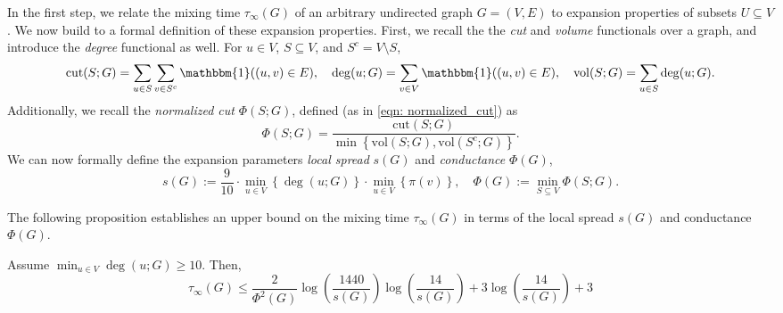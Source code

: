 \documentclass[11pt,twoside]{article}
\newcommand{\set}[1]{\left\{#1\right\}}
\newcommand{\vol}{\mathrm{vol}}
\newcommand{\cut}{\mathrm{cut}}
\newcommand{\1}{\mathbbm{1}}
\begin{document}
In the first step, we relate the mixing time $\tau_{\infty}(G)$ of an arbitrary undirected graph $G = (V,E)$ to expansion properties of subsets $U \subseteq V$. We now build to a formal definition of these expansion properties. First, we recall the the \emph{cut} and \emph{volume} functionals over a graph, and introduce the \emph{degree} functional as well. For $u \in V$, $S \subseteq V$, and $S^c = V \setminus S$,
\begin{equation*}
\cut(S;G) = \sum_{u \in S} \sum_{v \in S^c} \1((u,v) \in E), \quad \deg(u;G) = \sum_{v \in V} \1((u,v) \in E), \quad \vol(S;G) = \sum_{u \in S} \deg(u;G).
\end{equation*}
Additionally, we recall the \emph{normalized cut} $\Phi(S;G)$, defined (as in \eqref{eqn: normalized_cut}) as
\begin{equation*}
\Phi(S;G) = \frac{\cut(S; G)}{\min\set{\vol(S; G),\vol(S^c; G)}}.
\end{equation*}
We can now formally define the expansion parameters \emph{local spread} $s(G)$ and \emph{conductance} $\Phi(G)$,
\begin{equation*}
s(G) := \frac{9}{10} \cdot \min_{u \in V} \set{\deg(u; G)} \cdot \min_{u \in V} \set{\pi(v)}, \quad \Phi(G) := \min_{S \subseteq V} \Phi(S;G).
\end{equation*}

The following proposition establishes an upper bound on the mixing time $\tau_{\infty}(G)$ in terms of the local spread $s(G)$ and conductance $\Phi(G)$.
\begin{proposition}
	\label{prop: pointwise_mixing_time}
	Assume $\min_{u \in V} \deg(u; G) \geq 10$. Then,
	\begin{equation*}
	\tau_{\infty}(G) \leq \frac{2}{\Phi^2(G)} \log \left(\frac{1440}{s(G)}\right)\log \left(\frac{14}{s(G)}\right)  + 3 \log \left(\frac{14}{s(G)}\right) + 3
	\end{equation*}
\end{proposition}
\end{document}
